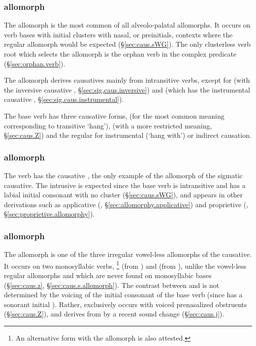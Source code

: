 \subsubsection{ allomorph} \label{sec:caus.CW}
The  allomorph is the most common of all alveolo-palatal allomorphs. It occurs on verb bases with initial clusters with nasal,  or  preinitials, contexts where the regular  allomorph would be expected (§\ref{sec:caus.sWG}). The only clusterless verb root which selects the   allomorph is the orphan verb  in the complex predicate  (§\ref{sec:orphan.verb}).

The  allomorph  derives causatives mainly from intransitive verbs, except for   (with the inversive causative , §\ref{sec:sig.caus.inversive}) and  (which has the instrumental causative  , §\ref{sec:sig.caus.instrumental}).

The base verb  has three causative forms,  (for the most common meaning corresponding to transitive `hang'), 
 (with a more restricted meaning, §\ref{sec:caus.Z}) and the regular  for instrumental (`hang with') or indirect causation.
 
\subsubsection{ allomorph} \label{sec:caus.CWG}
The verb   has the causative , the only example of the    allomorph of the sigmatic causative. The intrusive   is expected since the base verb is intransitive and has a labial initial consonant with no cluster (§\ref{sec:caus.sWG}), and appears in other derivations such as applicative (, §\ref{sec:allomorphy.applicative}) and proprietive (, §\ref{sec:proprietive.allomorphy}).
 
\subsubsection{ allomorph} \label{sec:caus.C}
The  allomorph is one of the three irregular vowel-less allomorphs of the causative. It occurs on two monosyllabic verbs, \footnote{An alternative form  with the  allomorph is also attested. } (from ) and  (from ), unlike the vowel-less regular allomorphs  and  which are never found on monosyllabic bases (§\ref{sec:caus.z}, §\ref{sec:caus.s.allomorph}). The contrast between  and  is not determined by the voicing of the initial consonant of the base verb (since  has a sonorant initial ). Rather,  exclusively occurs with voiced prenasalized obstruents (§\ref{sec:caus.Z}), and  derives from  by a recent sound change (§\ref{sec:caus.j}). 

